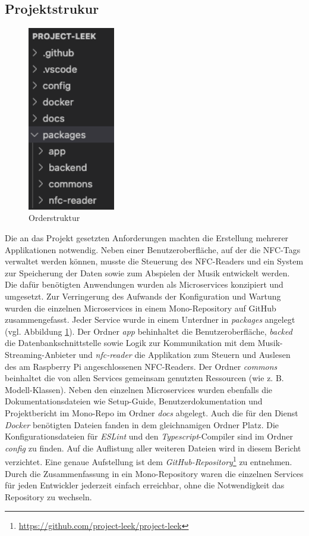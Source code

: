 \documentclass[10pt, a4paper]{article}
\begin{document}
\subsection{Projektstrukur}
\begin{figure}
  \includegraphics[width=3.8cm]{PackageStruktur.png}
  \caption{Orderstruktur}
  \label{fig:Orderstruktur}
\end{figure}
Die an das Projekt gesetzten Anforderungen machten die Erstellung mehrerer Applikationen notwendig. Neben einer Benutzeroberfläche, auf der die NFC-Tags
verwaltet werden können, musste die Steuerung des NFC-Readers und ein System zur Speicherung der Daten sowie zum Abspielen der Musik entwickelt werden.
Die dafür benötigten Anwendungen wurden als Microservices konzipiert und umgesetzt. Zur Verringerung des Aufwands der Konfiguration und Wartung wurden die einzelnen Microservices in einem Mono-Repository auf GitHub zusammengefasst.
Jeder Service wurde in einem Unterdner in \textit{packages} angelegt (vgl. Abbildung \ref{fig:Orderstruktur}). Der Ordner \textit{app} behinhaltet die Benutzeroberfläche,
\textit{backed} die Datenbankschnittstelle sowie Logik zur Kommunikation mit dem Musik-Streaming-Anbieter und \textit{nfc-reader} die Applikation zum Steuern und Auslesen des am Raspberry Pi angeschlossenen NFC-Readers.
Der Ordner \textit{commons} beinhaltet die von allen Services gemeinsam genutzten Ressourcen (wie z. B. Modell-Klassen).
Neben den einzelnen Microservices wurden ebenfalls die Dokumentationsdateien wie Setup-Guide, Benutzerdokumentation und Projektbericht im Mono-Repo im Ordner \textit{docs} abgelegt.
Auch die für den Dienst \textit{Docker} benötigten Dateien fanden in dem gleichnamigen Ordner Platz. Die Konfigurationsdateien für \textit{ESLint} und den \textit{Typescript}-Compiler sind im Ordner \textit{config} zu finden.
Auf die Auflistung aller weiteren Dateien wird in diesem Bericht verzichtet. Eine genaue Aufstellung ist dem \textit{GitHub-Repository}\footnote{\url{https://github.com/project-leek/project-leek}} zu entnehmen.
Durch die Zusammenfassung in ein Mono-Repository waren die einzelnen Services für jeden Entwickler jederzeit einfach erreichbar, ohne die Notwendigkeit das Repository zu wechseln.
\end{document}
